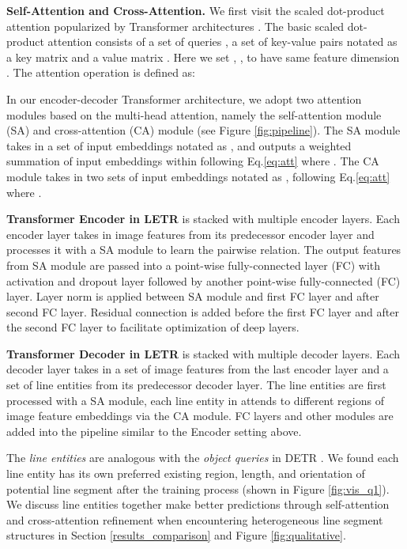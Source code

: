 \documentclass[final]{cvpr}
\begin{document}
\vspace{2mm}
\noindent\textbf{Self-Attention and Cross-Attention.} We first visit the scaled dot-product attention popularized by Transformer architectures \cite{vaswani2017attention}. The basic scaled dot-product attention consists of a set of  queries , a set of  key-value pairs notated as a key matrix  and a value matrix . Here we set , ,  to have same feature dimension . 
The attention operation  is defined as:
\vspace{-3mm}



In our encoder-decoder Transformer architecture, we adopt two attention modules based on the multi-head attention, namely the self-attention module (SA) and cross-attention (CA) module (see Figure \ref{fig:pipeline}). The SA module takes in a set of input embeddings notated as , and outputs a weighted summation  of input embeddings within  following Eq.\ref{eq:att} where . The CA module takes in two sets of input embeddings notated as ,  following Eq.\ref{eq:att} where .       

\noindent\textbf{Transformer Encoder in LETR} is stacked with multiple encoder layers. Each encoder layer takes in image features  from its predecessor encoder layer and processes it with a SA module to learn the pairwise relation. The output features from SA module are passed into a point-wise fully-connected layer (FC) with activation and dropout layer followed by another point-wise fully-connected (FC) layer. Layer norm is applied between SA module and first FC layer and after second FC layer. Residual connection is added before the first FC layer and after the second FC layer to facilitate optimization of deep layers. 

\noindent\textbf{Transformer Decoder in LETR} is stacked with multiple decoder layers. Each decoder layer takes in a set of image features  from the last encoder layer and a set of line entities  from its predecessor decoder layer. The line entities are first processed with a SA module, each line entity  in  attends to different regions of image feature embeddings  via the CA module. FC layers and other modules are added into the pipeline similar to the Encoder setting above. 

 The \textit{line entities} are analogous with the \textit{object queries} in DETR \cite{carion2020end}. We found each line entity has its own preferred existing region, length, and orientation of potential line segment after the training process (shown in Figure \ref{fig:vis_q1}). We discuss line entities together make better predictions through self-attention and cross-attention refinement when encountering heterogeneous line segment structures in Section \ref{results_comparison} and Figure \ref{fig:qualitative}.
\end{document}

